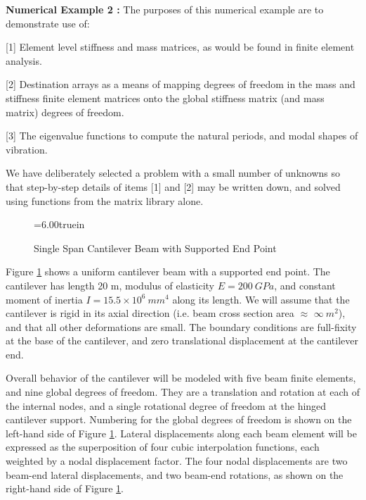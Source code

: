 \clearpage
{}
\vspace{0.15 in}\noindent
{\bf Numerical Example 2 :}
The purposes of this numerical example are to demonstrate use of:
\begin{description}
\item{[1]}
Element level stiffness and mass matrices,
as would be found in finite element analysis.
\item{[2]}
Destination arrays as a means of mapping degrees of freedom
in the mass and stiffness finite element matrices onto the
global stiffness matrix (and mass matrix) degrees of freedom.
\item{[3]}
The eigenvalue functions to compute the natural periods,
and modal shapes of vibration.
\end{description}

\vspace{0.15 in}\noindent
We have deliberately selected a problem with a small number of
unknowns so that step-by-step details of items [1] and [2] 
may be written down, and solved using functions from the matrix library alone.

\vspace{0.15 in}
\begin{figure} [ht]
\epsfxsize=6.00truein
\centerline{}
\caption{Single Span Cantilever Beam with Supported End Point}
\label{fig:elastic-beam-geometry}
\end{figure}

\vspace{0.15 in}\noindent
Figure \ref{fig:elastic-beam-geometry} shows a uniform
cantilever beam with a supported end point.
The cantilever has length 20 m, modulus of elasticity $E = 200 ~GPa$,
and constant moment of inertia $I = 15.5 \times 10^6 ~mm^4$ along its length.
We will assume that the cantilever is rigid in its axial direction (i.e. beam cross
section area $\approx$ $\infty ~m^2$), and that all other deformations are small.
The boundary conditions are full-fixity at the base of the cantilever,
and zero translational displacement at the cantilever end.

\vspace{0.15 in}
\noindent\hspace{0.5 in}
Overall behavior of the cantilever will be modeled with
five beam finite elements, and nine global degrees of freedom.
They are a translation and rotation at each of the internal nodes,
and a single rotational degree of freedom at the hinged cantilever support. 
Numbering for the global degrees of freedom is shown on the
left-hand side of Figure \ref{fig:elastic-beam-geometry}.
Lateral displacements along each beam element will be expressed
as the superposition of four cubic interpolation functions,
each weighted by a nodal displacement factor. The four nodal displacements
are two beam-end lateral displacements, and two beam-end rotations,
as shown on the right-hand side of Figure \ref{fig:elastic-beam-geometry}.

